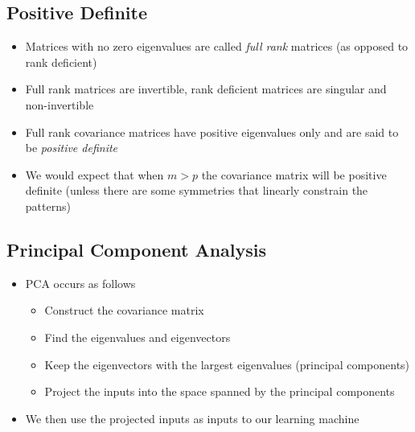
\begin{slide}
\section{Positive Definite}

\begin{PauseHighLight}

\begin{itemize}
\item Matrices with no zero eigenvalues are called \emph{full rank}
  matrices (as opposed to rank deficient)\pause
\item Full rank matrices are invertible, rank deficient matrices are
  singular and non-invertible\pause
\item Full rank covariance matrices have positive eigenvalues only and are
  said to be \emph{positive definite}\pause
\item We would expect that when $m>p$ the covariance matrix will be
  positive definite (unless there are some symmetries that linearly constrain the
  patterns)\pause
\end{itemize}

\end{PauseHighLight}
\end{slide}

\Outline %

\begin{slide}
\section{Principal Component Analysis}

\begin{PauseHighLight}

\begin{itemize}\squeeze
\item PCA occurs as follows\pause
  \begin{itemize}
  \item Construct the covariance matrix\pause
  \item Find the eigenvalues and eigenvectors\pause
  \item Keep the eigenvectors with the largest eigenvalues (principal
    components)\pause
  \item Project the inputs into the space spanned by the principal
    components \pause
  \end{itemize}
\item  We then use the projected inputs as inputs to our learning
  machine\pause
\end{itemize}

\end{PauseHighLight}
\end{slide}

